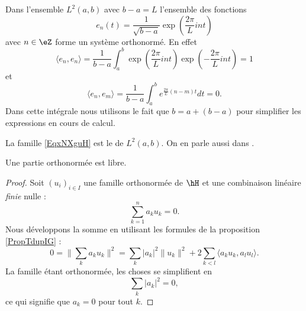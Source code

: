 \begin{example}
    Dans l'ensemble \( L^2(a,b)\) avec \( b-a=L\) l'ensemble des fonctions
    \begin{equation}        \label{EqxNXguH}
        e_n(t)=\frac{1}{ \sqrt{b-a} }\exp(\frac{ 2\pi }{ L }int)
    \end{equation}
    avec \( n\in \eZ\) forme un système orthonormé. En effet
    \begin{equation}
        \langle e_n, e_n\rangle =\frac{1}{ b-a }\int_a^b\exp(\frac{ 2\pi }{ L }int)\exp(-\frac{ 2\pi }{ L }int)=1
    \end{equation}
    et
    \begin{equation}
        \langle e_n, e_m\rangle =\frac{1}{ b-a }\int_a^b e^{\frac{ 2\pi }{ L }(n-m)t}dt=0.
    \end{equation}
    Dans cette intégrale nous utilisons le fait que \( b=a+(b-a)\) pour simplifier les expressions en cours de calcul.

    La famille \eqref{EqxNXguH} est le  de \( L^2(a,b)\). On en parle aussi dans \cite{KuttlerTopInAl}.
\end{example}

\begin{proposition}     \label{PROPooMOQRooCPFnPC}
    Une partie orthonormée est libre.
\end{proposition}

\begin{proof}
    Soit \( (u_i)_{i\in I}\) une famille orthonormée de \( \hH\) et une combinaison linéaire \emph{finie} nulle :
    \begin{equation}
        \sum_{k=1}^{n}a_ku_k=0.
    \end{equation}
    Nous développons la somme en utilisant les formules de la proposition \ref{PropTdupIG} :
    \begin{equation}
        0=\| \sum_ka_ku_k \|^2=\sum_k| a_k |^2\| u_k \|^2+2\sum_{k<l}\langle a_ku_k, a_lu_l\rangle .
    \end{equation}
    La famille étant orthonormée, les choses se simplifient en
    \begin{equation}
        \sum_k| a_k |^2=0,
    \end{equation}
    ce qui signifie que \( a_k=0\) pour tout \( k\).
\end{proof}

